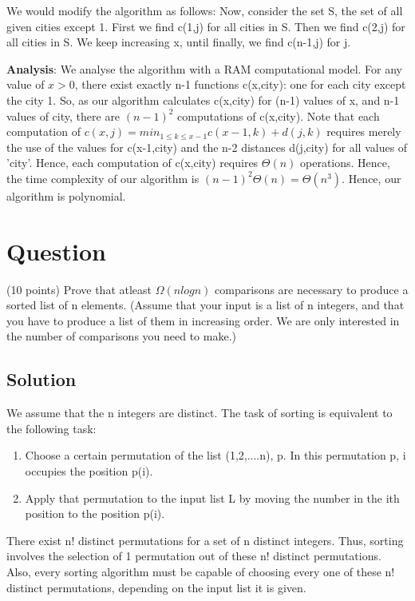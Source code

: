 \documentclass[10pt]{article}
\begin{document}
We would modify the algorithm as follows: Now, consider the set S, the set of all given cities except 1. First we find c(1,j) for all cities in S. Then we find c(2,j) for all cities in S. We keep increasing x, until finally, we find c(n-1,j) for j.

\textbf{Analysis}: We analyse the algorithm with a RAM computational model. For any value of $x>0$, there exist exactly n-1 functions c(x,city): one for each city except the city 1. So, as our algorithm calculates c(x,city) for (n-1) values of x, and n-1 values of city, there are $(n-1)^{2}$ computations of c(x,city). Note that each computation of $c(x,j) = min_{1\leq k \leq x-1}c(x-1,k) + d(j,k)$ requires merely the use of the values for c(x-1,city) and the n-2 distances d(j,city) for all values of 'city'. Hence, each computation of c(x,city) requires $\Theta(n)$ operations. Hence, the time complexity of our algorithm is $(n-1)^{2}\Theta(n)=\Theta(n^{3})$. Hence, our algorithm is polynomial.

\section{Question}

(10 points) Prove that atleast $\Omega(n log n)$ comparisons are necessary to produce a sorted list of n elements. (Assume that your input is a list of n integers, and that you have to produce a list of them in increasing order. We are only interested in the number of comparisons you need to make.)

\subsection{Solution}

We assume that the n integers are distinct. The task of sorting is equivalent to the following task: 

\begin{enumerate}
\item Choose a certain permutation of the list (1,2,....n), p. In this permutation p, i occupies the position p(i).
\item Apply that permutation to the input list L by moving the number in the ith position to the position p(i).
\end{enumerate}

There exist n! distinct permutations for a set of n distinct integers. Thus, sorting involves the selection of 1 permutation out of these n! distinct permutations. Also, every sorting algorithm must be capable of choosing every one of these n! distinct permutations, depending on the input list it is given.
\end{document}
